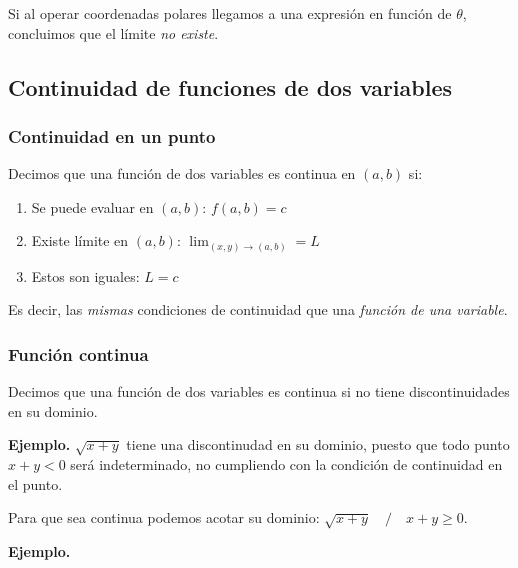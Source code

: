 Si al operar coordenadas polares llegamos a una expresión en función de
\(\theta\),
concluimos que el límite \textit{no existe}.

\subsection{Continuidad de funciones de dos variables}

\subsubsection{Continuidad en un punto}

Decimos que una función de dos variables es continua en \((a,b)\) si:

\begin{enumerate}
    \item Se puede evaluar en \((a,b)\): \(f(a,b) = c\)
    \item Existe límite en \((a,b)\): \(\lim_{(x,y) \to (a,b)} = L\)
    \item Estos son iguales: \(L = c\)
\end{enumerate}

Es decir,
las \textit{mismas} condiciones de continuidad que una \textit{función de una
    variable}.

\subsubsection{Función continua}

Decimos que una función de dos variables es continua si no tiene
discontinuidades en su dominio.

\textbf{Ejemplo.}
\(\sqrt{x+y}\) tiene una discontinudad en su dominio, puesto que todo punto
\(x+y<0\) será indeterminado, no cumpliendo con la condición de continuidad en
el punto.

Para que sea continua podemos acotar su dominio:
\(\sqrt{x+y} \quad/\quad x+y \geq 0\).

\vspace{.5cm}
\textbf{Ejemplo.}

